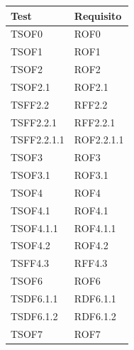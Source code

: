 \documentclass[openany,12pt,a4paper]{report}
\begin{document}
\begin{longtable}{| p{4cm} |p{4cm}  |}
	\hline
	\textbf{Test} & \textbf{Requisito}\\
	\hline
	\endhead
	TSOF0&ROF0
	\\[1em]
	\hline TSOF1&ROF1
	\\[1em]	
	\hline
	 TSOF2&ROF2
	\\[1em]	
	\hline	
	 TSOF2.1&ROF2.1
	\\[1em]	
	\hline	
	 TSFF2.2&RFF2.2
	\\[1em]	
	\hline
	 TSFF2.2.1&RFF2.2.1
	\\[1em]	
	\hline
	 TSFF2.2.1.1&ROF2.2.1.1
	\\[1em]	
	\hline
	 TSOF3&ROF3
	\\[1em]	
	\hline	
	 TSOF3.1&ROF3.1
	\\[1em]		
	\hline
	 TSOF4&ROF4
	\\[1em]
	\hline
	 TSOF4.1&ROF4.1
	\\[1em]
	
	\hline	
	TSOF4.1.1&ROF4.1.1
	\\[1em]
	
	\hline
	 TSOF4.2&ROF4.2
	\\[1em]
	\hline
	 TSFF4.3&RFF4.3
	\\[1em]
	\hline
	 TSOF6&ROF6
	\\[1em]
	\hline
	 TSDF6.1.1&RDF6.1.1
	\\[1em]
	\hline	
	 TSDF6.1.2&RDF6.1.2
	\\[1em]
	\hline	
	 TSOF7&ROF7
	\\[1em]
	

\end{longtable}
\end{document}
